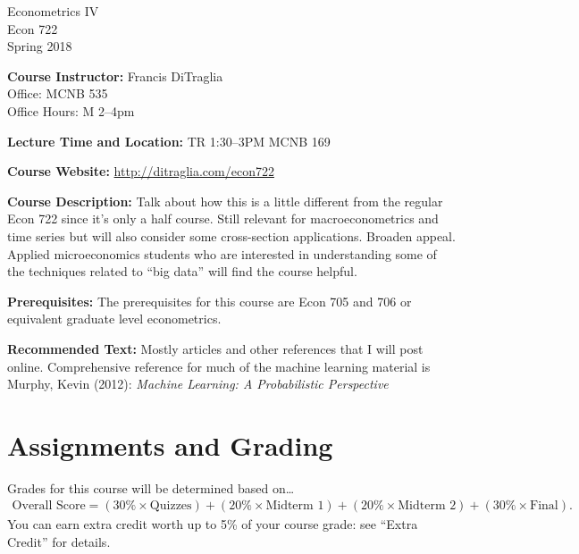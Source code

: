 \documentclass[11pt, letterpaper]{article}
\begin{document}
\thispagestyle{plain}

\begin{center}
\Large
\sc
Econometrics IV\\
\large
Econ 722\\
\large
Spring 2018
\end{center}



\normalsize

\noindent \textbf{Course Instructor:} Francis DiTraglia \\
Office: MCNB 535\\
Office Hours: M 2--4pm 

\medskip

 
\noindent \textbf{Lecture Time and Location:} 
TR 1:30--3PM MCNB 169 

\medskip
 
\noindent \textbf{Course Website:} \url{http://ditraglia.com/econ722} 

\medskip



\noindent \textbf{Course Description:} 
Talk about how this is a little different from the regular Econ 722 since it's only a half course.
Still relevant for macroeconometrics and time series but will also consider some cross-section applications.
Broaden appeal.
Applied microeconomics students who are interested in understanding some of the techniques related to ``big data'' will find the course helpful.



\medskip

\noindent \textbf{Prerequisites:} 
The prerequisites for this course are Econ 705 and 706 or equivalent graduate level econometrics. 



\medskip

\noindent \textbf{Recommended Text:} 
Mostly articles and other references that I will post online.
Comprehensive reference for much of the machine learning material is
Murphy, Kevin (2012): {\em Machine Learning: A Probabilistic Perspective}

\medskip


\section*{Assignments and Grading}

Grades for this course will be determined based on\dots 
	\begin{equation*}
	\begin{split}
		\mbox{Overall Score} = (30\% \times \mbox{Quizzes})  + (20\% \times \mbox{Midterm 1}) + (20\% \times \mbox{Midterm 2}) + (30\% \times \mbox{Final}).
	\end{split}
	\end{equation*}
You can earn extra credit worth up to 5\% of your course grade: see ``Extra Credit'' for details.
\end{document}
